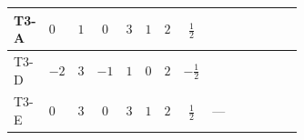 \documentclass[8pt]{article}
\begin{document}
\begin{landscape}
\begin{longtable}{@{}llcccccc >{\raggedright\arraybackslash}p{0.21\linewidth} >{\raggedright\arraybackslash}p{0.21\linewidth} >{\raggedright\arraybackslash}p{0.21\linewidth}@{}}
\midrule
T3-A & $0$ & $1$ & $0$ & $3$ & $1$ & $2$ & $\frac{1}{2}$ & \scriptsize\adjustbox{max width=\linewidth}{$\begin{gathered} +2 {\lambda_{12}} {\lambda_{H1}}\end{gathered}$} & \scriptsize\adjustbox{max width=\linewidth}{$\begin{gathered} +6 {\lambda_H} {\lambda_{H2}}\end{gathered}$} & \scriptsize\adjustbox{max width=\linewidth}{$\begin{gathered} +4 {\lambda_{H2}}^2\end{gathered}$} \\
\midrule
T3-D & $-2$ & $3$ & $-1$ & $1$ & $0$ & $2$ & $-\frac{1}{2}$ & \scriptsize\adjustbox{max width=\linewidth}{$\begin{gathered} +6 {\lambda_{12}} {\lambda_{H1}}\end{gathered}$} & \scriptsize\adjustbox{max width=\linewidth}{$\begin{gathered} +6 {\lambda_H} {\lambda_{H2}}\end{gathered}$} & \scriptsize\adjustbox{max width=\linewidth}{$\begin{gathered} +4 {\lambda_{H2}}^2\end{gathered}$} \\
\midrule
T3-E & $0$ & $3$ & $0$ & $3$ & $1$ & $2$ & $\frac{1}{2}$ & --- & \scriptsize\adjustbox{max width=\linewidth}{$\begin{gathered} +6 {\lambda_H} {\lambda_{H2}}\end{gathered}$} & \scriptsize\adjustbox{max width=\linewidth}{$\begin{gathered} +4 {\lambda_{H2}}^2\end{gathered}$} \\
\midrule
\bottomrule
\end{longtable}
\clearpage

\end{landscape}
\end{document}
